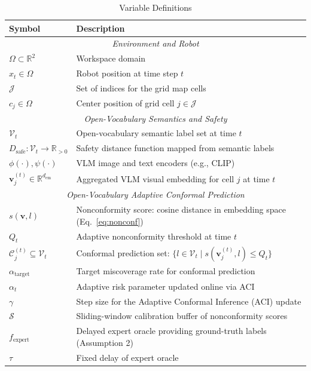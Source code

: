 \documentclass[letterpaper, 10 pt, conference]{ieeeconf}  %
\begin{document}
\begin{table}[h]
\caption{Variable Definitions}
\label{tab:notation}
\centering
\begin{tabular}{l l}
\hline
\textbf{Symbol} & \textbf{Description} \\
\hline
\multicolumn{2}{c}{\textit{Environment and Robot}} \\
$\Omega \subset \mathbb{R}^2$ & Workspace domain \\
$x_t \in \Omega$ & Robot position at time step $t$ \\
$\mathcal{J}$ & Set of indices for the grid map cells \\
$c_j \in \Omega$ & Center position of grid cell $j \in \mathcal{J}$ \\
\hline
\multicolumn{2}{c}{\textit{Open-Vocabulary Semantics and Safety}} \\
$\mathcal{V}_t$ & Open-vocabulary semantic label set at time $t$ \\
$D_{\text{safe}}: \mathcal{V}_t \to \mathbb{R}_{>0}$ & Safety distance function mapped from semantic labels \\
$\phi(\cdot), \psi(\cdot)$ & VLM image and text encoders (e.g., CLIP) \\
$\mathbf{v}_j^{(t)} \in \mathbb{R}^{d_{\text{em}}}$ & Aggregated VLM visual embedding for cell $j$ at time $t$ \\
\hline
\multicolumn{2}{c}{\textit{Open-Vocabulary Adaptive Conformal Prediction}} \\
$s(\mathbf{v}, l)$ & Nonconformity score: cosine distance in embedding space (Eq.~\ref{eq:nonconf}) \\
$Q_t$ & Adaptive nonconformity threshold at time $t$ \\
$\mathcal{C}_j^{(t)} \subseteq \mathcal{V}_t$ & Conformal prediction set: $\{ l \in \mathcal{V}_t \mid s(\mathbf{v}_j^{(t)}, l) \le Q_t \}$ \\
$\alpha_{\text{target}}$ & Target miscoverage rate for conformal prediction \\
$\alpha_t$ & Adaptive risk parameter updated online via ACI \\
$\gamma$ & Step size for the Adaptive Conformal Inference (ACI) update \\
$\mathcal{S}$ & Sliding-window calibration buffer of nonconformity scores \\
$f_{\text{expert}}$ & Delayed expert oracle providing ground-truth labels (Assumption 2) \\
$\tau$ & Fixed delay of expert oracle \\

\end{tabular}
\end{table}
\end{document}
